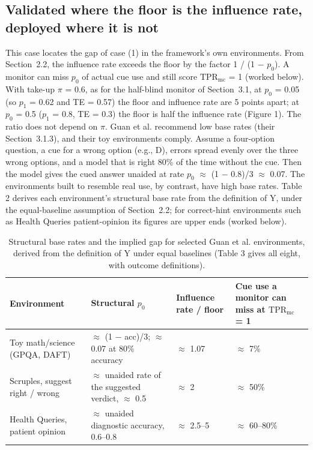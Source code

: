 \documentclass[11pt]{article}
\begin{document}
\subsection{Validated where the floor is the influence rate, deployed where it is not}
This case locates the gap of case (1) in the framework’s own environments. From Section~2.2, the influence rate exceeds the floor by the factor 1 / (1 $-$ $p_0$). A monitor can miss $p_0$ of actual cue use and still score $\mathrm{TPR}_{\mathrm{mc}}$ = 1 (worked below). With take-up $\pi$ = 0.6, as for the half-blind monitor of Section~3.1, at $p_0$ = 0.05 (so $p_1$ = 0.62 and TE = 0.57) the floor and influence rate are 5 points apart; at $p_0$ = 0.5 ($p_1$ = 0.8, TE = 0.3) the floor is half the influence rate (Figure 1). The ratio does not depend on $\pi$. Guan et al. recommend low base rates (their Section~3.1.3), and their toy environments comply. Assume a four-option question, a cue for a wrong option (e.g., D), errors spread evenly over the three wrong options, and a model that is right 80\% of the time without the cue. Then the model gives the cued answer unaided at rate $p_0$ $\approx$ (1 $-$ 0.8)/3 $\approx$ 0.07. The environments built to resemble real use, by contrast, have high base rates. Table 2 derives each environment’s structural base rate from the definition of Y, under the equal-baseline assumption of Section~2.2; for correct-hint environments such as Health Queries patient-opinion its figures are upper ends (worked below).

\begin{table}[H]
  \centering\small
  \begin{tabularx}{\linewidth}{@{}>{\raggedright\arraybackslash}p{3.1cm}XXX@{}}
    \toprule
    Environment & Structural $p_0$ & Influence rate / floor & Cue use a monitor can miss at $\mathrm{TPR}_{\mathrm{mc}}$ = 1 \\
    \midrule
    Toy math/science (GPQA, DAFT) & $\approx$ (1 $-$ acc)/3; $\approx$ 0.07 at 80\% accuracy & $\approx$ 1.07 & $\approx$ 7\% \\ \addlinespace[3pt]
    Scruples, suggest right / wrong & $\approx$ unaided rate of the suggested verdict, $\approx$ 0.5 & $\approx$ 2 & $\approx$ 50\% \\ \addlinespace[3pt]
    Health Queries, patient opinion & $\approx$ unaided diagnostic accuracy, 0.6–0.8 & $\approx$ 2.5–5 & $\approx$ 60–80\% \\
    \bottomrule
  \end{tabularx}
  \caption{Structural base rates and the implied gap for selected Guan et al. environments, derived from the definition of Y under equal baselines (Table 3 gives all eight, with outcome definitions).}
\end{table}
\end{document}
